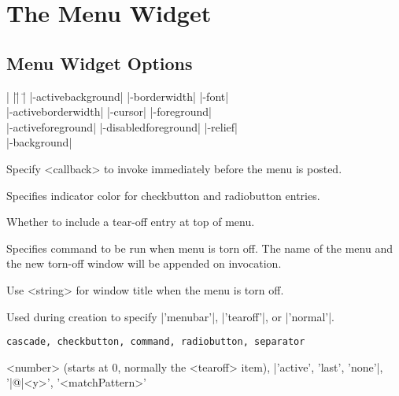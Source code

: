 
\section{The Menu Widget}

\subsection*{Menu Widget Options}
\begin{tabbing}
|                   |\=|                     |\= \kill
|-activebackground|  \> |-borderwidth|        \> |-font| \\
|-activeborderwidth| \> |-cursor|             \> |-foreground| \\
|-activeforeground|  \> |-disabledforeground| \> |-relief| \\
|-background| 	\\
\end{tabbing}

\vskip5pt
\begin{enum}{1cm}

Specify <callback> to invoke immediately before the menu is posted.

Specifies indicator color for checkbutton and radiobutton entries.

Whether to include a tear-off entry at top of menu.

Specifies command to be run when menu is torn off. The name of the
menu and the new torn-off window will be appended on invocation.

Use <string> for window title when the menu is torn off.

Used during creation to specify |'menubar'|, |'tearoff'|, or |'normal'|.

\end{enum}
\begin{enum}{2.5cm}

 {\tt cascade, checkbutton, command, radiobutton, separator}

 <number> (starts at 0, normally the <tearoff> item), |'active', 'last', 'none'|, '|@|<y>', '<matchPattern>'

\end{enum}


